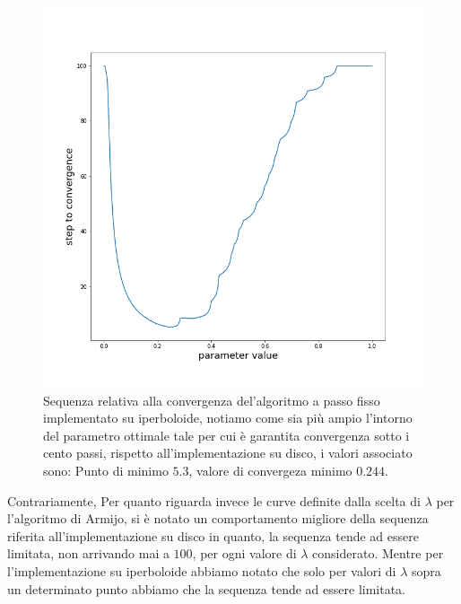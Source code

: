 \documentclass[a4paper, 12pt]{article}
\begin{document}
\begin{figure}[H] %
    \centering\includegraphics[width=1\textwidth]{fixed_step_parameter_hyperboloid.png}
    \caption{Sequenza relativa alla convergenza del'algoritmo a passo fisso implementato su iperboloide, notiamo come sia più ampio l'intorno del parametro ottimale tale per cui è garantita convergenza sotto i cento passi, rispetto all'implementazione su disco, i valori associato sono: Punto di minimo $5.3$, valore di convergeza minimo $0.244$.}
\end{figure}
Contrariamente, Per quanto riguarda invece le curve definite dalla scelta di $\lambda$ per l'algoritmo di Armijo, si è notato un comportamento migliore della sequenza riferita all'implementazione su disco in quanto, la sequenza tende ad essere limitata, non arrivando mai a $100$, per ogni valore di $\lambda$ considerato. Mentre per l'implementazione su iperboloide abbiamo notato che solo per valori di $\lambda$ sopra un determinato punto abbiamo che la sequenza tende ad essere limitata.\\
\end{document}
